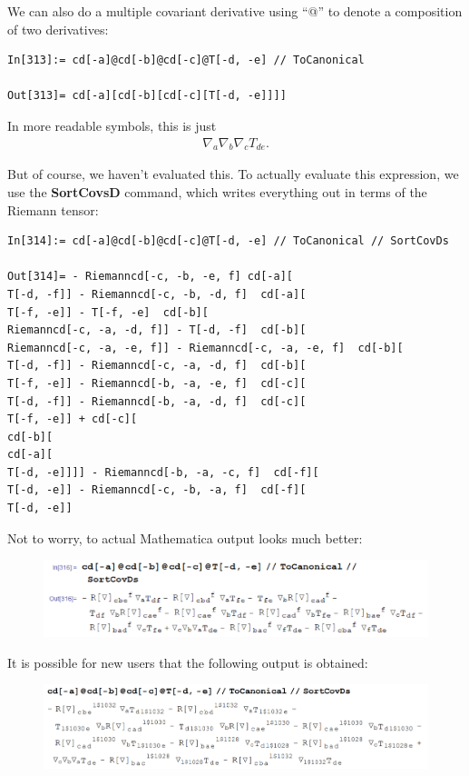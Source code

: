 \documentclass{book}
\theoremstyle{definition}
\begin{document}
We can also do a multiple covariant derivative using ``@'' to denote a composition of two derivatives:
\begin{lstlisting}
In[313]:= cd[-a]@cd[-b]@cd[-c]@T[-d, -e] // ToCanonical

Out[313]= cd[-a][cd[-b][cd[-c][T[-d, -e]]]]
\end{lstlisting}
In more readable symbols, this is just
\begin{align}
\nabla_a \nabla_b \nabla_c T_{de}.
\end{align}

But of course, we haven't evaluated this. To actually evaluate this expression, we use the \textbf{SortCovsD} command, which writes everything out in terms of the Riemann tensor:
\begin{lstlisting}
In[314]:= cd[-a]@cd[-b]@cd[-c]@T[-d, -e] // ToCanonical // SortCovDs

Out[314]= - Riemanncd[-c, -b, -e, f] cd[-a][
T[-d, -f]] - Riemanncd[-c, -b, -d, f]  cd[-a][
T[-f, -e]] - T[-f, -e]  cd[-b][
Riemanncd[-c, -a, -d, f]] - T[-d, -f]  cd[-b][
Riemanncd[-c, -a, -e, f]] - Riemanncd[-c, -a, -e, f]  cd[-b][
T[-d, -f]] - Riemanncd[-c, -a, -d, f]  cd[-b][
T[-f, -e]] - Riemanncd[-b, -a, -e, f]  cd[-c][
T[-d, -f]] - Riemanncd[-b, -a, -d, f]  cd[-c][
T[-f, -e]] + cd[-c][
cd[-b][
cd[-a][
T[-d, -e]]]] - Riemanncd[-b, -a, -c, f]  cd[-f][
T[-d, -e]] - Riemanncd[-c, -b, -a, f]  cd[-f][
T[-d, -e]]
\end{lstlisting}

Not to worry, to actual Mathematica output looks much better:
\begin{figure}[!htb]
	\includegraphics[scale=0.25]{sortcovsd}
\end{figure}

It is possible for new users that the following output is obtained:
\begin{figure}[!htb]
	\includegraphics[scale=0.25]{dollars0}
\end{figure}
\end{document}
